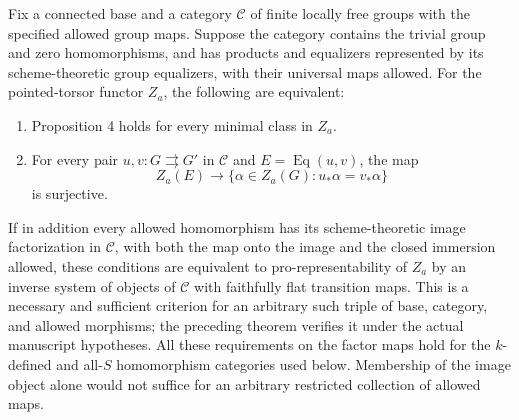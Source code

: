 \begin{proposition}
\label{C:criterion}
Fix a connected base and a category $\mathcal C$ of finite locally free
groups with the specified allowed group maps.  Suppose the category
contains the trivial group and zero homomorphisms, and has products
and equalizers represented by its scheme-theoretic group equalizers,
with their universal maps allowed.  For the pointed-torsor functor
$Z_a$, the following are
equivalent:
\begin{enumerate}
\item Proposition 4 holds for every minimal class in $Z_a$.
\item For every pair $u,v\colon G\rightrightarrows G'$ in $\mathcal C$
and $E=\operatorname{Eq}(u,v)$, the map
\[
Z_a(E)\longrightarrow
\{\alpha\in Z_a(G):u_*\alpha=v_*\alpha\}
\]
is surjective.
\end{enumerate}
If in addition every allowed homomorphism has its scheme-theoretic
image factorization in $\mathcal C$, with both the map onto the image
and the closed immersion allowed, these conditions are equivalent to
pro-representability of $Z_a$ by an inverse system of objects of
$\mathcal C$ with faithfully flat transition maps.
This is a necessary and sufficient criterion for an arbitrary such
triple of base, category, and allowed morphisms; the preceding theorem
verifies it under the actual manuscript hypotheses.
All these requirements on the factor maps hold for the $k$-defined
and all-$S$ homomorphism categories used below.  Membership of the
image object alone would not suffice for an arbitrary restricted
collection of allowed maps.
\end{proposition}

